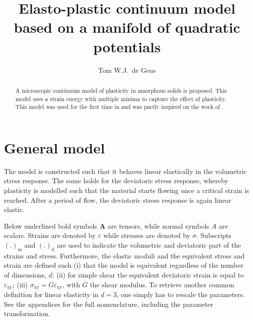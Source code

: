 \documentclass[fleqn]{goose-article}
\title{%
    Elasto-plastic continuum model
    based on a manifold of quadratic potentials
}
\author{Tom W.J.\ de Geus}
\newcommand\T[1]{\underline{\bm{{#1}}}}
\begin{document}
\maketitle

\begin{abstract}
\noindent
A microscopic continuum model of plasticity in amorphous solids is proposed.
This model uses a strain energy with multiple minima to capture the effect of plasticity.
This model was used for the first time in \citet{DeGeus2019}
and was partly inspired on the work of \citet{Jagla2017}.

\end{abstract}

\setcounter{tocdepth}{3}
\tableofcontents

\vfill\newpage
\section{General model}

The model is constructed such that it behaves linear elastically in the volumetric stress response.
The same holds for the deviatoric stress response, whereby plasticity is modelled
such that the material starts flowing once a critical strain is reached.
After a period of flow, the deviatoric stress response is again linear elastic.

Below underlined bold symbols $\T{A}$ are tensors, while normal symbols $A$ are scalars.
Strains are denoted by $\varepsilon$ while stresses are denoted by $\sigma$.
Subscripts $(.)_\mathrm{m}$ and $(.)_\mathrm{d}$ are used to indicate the
volumetric and deviatoric part of the strains and stress.
Furthermore, the elastic moduli and the equivalent stress and strain are defined such
(i) that the model is equivalent regardless of the number of dimensions, $d$;
(ii) for simple shear the equivalent deviatoric strain is equal to $\varepsilon_\mathrm{xy}$;
(iii) $\sigma_\mathrm{xy} = G \varepsilon_\mathrm{xy}$, with $G$ the shear modulus.
To retrieve another common definition for linear elasticity in $d = 3$,
one simply has to rescale the parameters.
See the appendices for the full nomenclature, including the parameter transformation.
\end{document}
